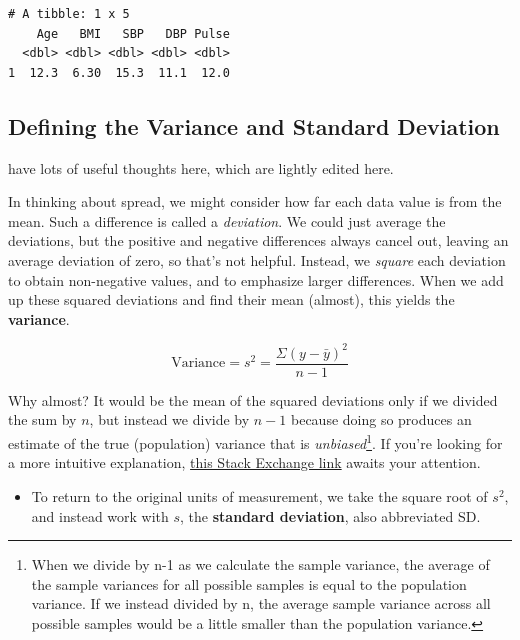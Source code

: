 \documentclass[
]{book}
\providecommand{\tightlist}{%
  \setlength{\itemsep}{0pt}\setlength{\parskip}{0pt}}
\begin{document}
\begin{verbatim}
# A tibble: 1 x 5
    Age   BMI   SBP   DBP Pulse
  <dbl> <dbl> <dbl> <dbl> <dbl>
1  12.3  6.30  15.3  11.1  12.0
\end{verbatim}

\hypertarget{defining-the-variance-and-standard-deviation}{%
\subsection{Defining the Variance and Standard Deviation}\label{defining-the-variance-and-standard-deviation}}

\citet{BockVD} have lots of useful thoughts here, which are lightly edited here.

In thinking about spread, we might consider how far each data value is from the mean. Such a difference is called a \emph{deviation}. We could just average the deviations, but the positive and negative differences always cancel out, leaving an average deviation of zero, so that's not helpful. Instead, we \emph{square} each deviation to obtain non-negative values, and to emphasize larger differences. When we add up these squared deviations and find their mean (almost), this yields the \textbf{variance}.

\[
\mbox{Variance} = s^2 = \frac{\Sigma (y - \bar{y})^2}{n-1}
\]

Why almost? It would be the mean of the squared deviations only if we divided the sum by \(n\), but instead we divide by \(n-1\) because doing so produces an estimate of the true (population) variance that is \emph{unbiased}\footnote{When we divide by n-1 as we calculate the sample variance, the average of the sample variances for all possible samples is equal to the population variance. If we instead divided by n, the average sample variance across all possible samples would be a little smaller than the population variance.}. If you're looking for a more intuitive explanation, \href{http://stats.stackexchange.com/questions/3931/intuitive-explanation-for-dividing-by-n-1-when-calculating-standard-deviation}{this Stack Exchange link} awaits your attention.

\begin{itemize}
\tightlist
\item
  To return to the original units of measurement, we take the square root of \(s^2\), and instead work with \(s\), the \textbf{standard deviation}, also abbreviated SD.
\end{itemize}
\end{document}
